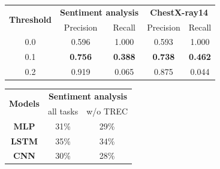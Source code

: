 \begin{table}[!b]
\begin{minipage}[t]{.58\textwidth}
	\vspace{-0.1in}
	\centering
  \begin{tabular}{c c c c c}
	\toprule
		\multirow{2}{*}{{\bf Threshold}}  & \multicolumn{2}{c}{{\bf Sentiment
		analysis}} & \multicolumn{2}{c}{{\bf ChestX-ray14}} \\
		& Precision &  Recall & Precision &  Recall \\
		\cmidrule(lr){1-1} \cmidrule(lr){2-3} \cmidrule(lr){4-5}
		0.0 & 0.596 & 1.000 & 0.593 & 1.000 \\
		0.1 & \textbf{0.756} & \textbf{0.388} & \textbf{0.738} & \textbf{0.462} \\
		0.2 & 0.919 & 0.065 & 0.875 & 0.044 \\
	\bottomrule
	\end{tabular}
	\vspace{0.1in}
	\label{tab:mtl_better_than_stl}
\end{minipage}%
\quad
	\begin{minipage}[t]{.40\textwidth}
	\vspace{-0.1in}
	\centering
	\begin{tabular}{c c c}
		\toprule
		\multirow{2}{*}{{\bf Models}} & \multicolumn{2}{c}{\bf Sentiment analysis} \\
		& all tasks & w/o TREC \\
		\midrule
		{\bf MLP}  & 31\% & 29\% \\
		{\bf LSTM} & 35\% & 34\% \\
		{\bf CNN}  & 30\% & 28\% \\
		\bottomrule
		\end{tabular}
	\vspace{0.1in}
	\label{tab:taskonomy}
\end{minipage}
\end{table}

